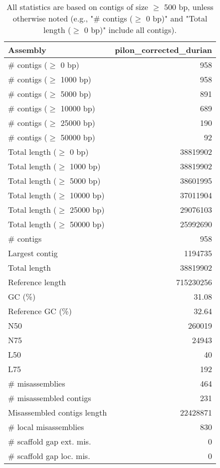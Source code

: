 \documentclass[12pt,a4paper]{article}
\begin{document}
\begin{table}[ht]
\begin{center}
\caption{All statistics are based on contigs of size $\geq$ 500 bp, unless otherwise noted (e.g., "\# contigs ($\geq$ 0 bp)" and "Total length ($\geq$ 0 bp)" include all contigs).}
\begin{tabular}{|l*{1}{|r}|}
\hline
Assembly & pilon\_corrected\_durian \\ \hline
\# contigs ($\geq$ 0 bp) & 958 \\ \hline
\# contigs ($\geq$ 1000 bp) & 958 \\ \hline
\# contigs ($\geq$ 5000 bp) & 891 \\ \hline
\# contigs ($\geq$ 10000 bp) & 689 \\ \hline
\# contigs ($\geq$ 25000 bp) & 190 \\ \hline
\# contigs ($\geq$ 50000 bp) & 92 \\ \hline
Total length ($\geq$ 0 bp) & 38819902 \\ \hline
Total length ($\geq$ 1000 bp) & 38819902 \\ \hline
Total length ($\geq$ 5000 bp) & 38601995 \\ \hline
Total length ($\geq$ 10000 bp) & 37011904 \\ \hline
Total length ($\geq$ 25000 bp) & 29076103 \\ \hline
Total length ($\geq$ 50000 bp) & 25992690 \\ \hline
\# contigs & 958 \\ \hline
Largest contig & 1194735 \\ \hline
Total length & 38819902 \\ \hline
Reference length & 715230256 \\ \hline
GC (\%) & 31.08 \\ \hline
Reference GC (\%) & 32.64 \\ \hline
N50 & 260019 \\ \hline
N75 & 24943 \\ \hline
L50 & 40 \\ \hline
L75 & 192 \\ \hline
\# misassemblies & 464 \\ \hline
\# misassembled contigs & 231 \\ \hline
Misassembled contigs length & 22428871 \\ \hline
\# local misassemblies & 830 \\ \hline
\# scaffold gap ext. mis. & 0 \\ \hline
\# scaffold gap loc. mis. & 0 \\ \hline

\end{tabular}
\end{center}
\end{table}
\end{document}
